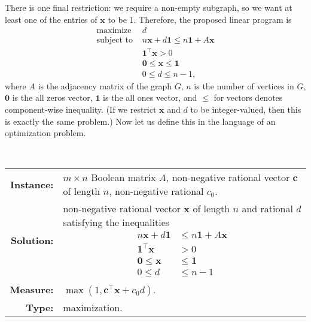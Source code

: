 There is one final restriction: we require a non-empty subgraph, so we want at least one of the entries of $\mathbf{x}$ to be $1$.
Therefore, the proposed linear program is
\begin{align*}
  \text{maximize } & d \\
  \text{subject to }
  & n \mathbf{x} + d \mathbf{1} \leq n \mathbf{1} + A \mathbf{x} \\
  & \mathbf{1}^\intercal \mathbf{x} > 0 \\
  & \mathbf{0} \leq \mathbf{x} \leq \mathbf{1} \\
  & 0 \leq d \leq n - 1,
\end{align*}
where $A$ is the adjacency matrix of the graph $G$, $n$ is the number of vertices in $G$, $\mathbf{0}$ is the all zeros vector, $\mathbf{1}$ is the all ones vector, and $\leq$ for vectors denotes component-wise inequality.
(If we restrict $\mathbf{x}$ and $d$ to be integer-valued, then this is exactly the same problem.)
Now let us define this in the language of an optimization problem.
\begin{definition}
  \mbox{} \\
  \begin{tabular}{r p{9.5cm}}
    \textbf{Instance:} & $m \times n$ Boolean matrix $A$, non-negative rational vector $\mathbf{c}$ of length $n$, non-negative rational $c_0$. \\
    \textbf{Solution:} & non-negative rational vector $\mathbf{x}$ of length $n$ and rational $d$ satisfying the inequalities
           {
             \begin{align*}
               n \mathbf{x} + d \mathbf{1} & \leq n \mathbf{1} + A \mathbf{x} \\
               \mathbf{1}^\intercal \mathbf{x} & > 0 \\
               \mathbf{0} \leq \mathbf{x} & \leq \mathbf{1} \\
               0 \leq d & \leq n - 1
             \end{align*}
           } \\[-1em]
    \textbf{Measure:} & $\max(1, \mathbf{c}^\intercal \mathbf{x} + c_0 d)$. \\
    \textbf{Type:} & maximization.
  \end{tabular}
\end{definition}


